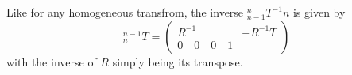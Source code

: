 Like for any homogeneous transfrom, the inverse $_{n-1}^nT^{-1}n$ is given by
\begin{equation}
^{n-1}_nT=\left(
\begin{array}{c|c}
R^{-1} & -R^{-1}T\\
\hline
0 \quad 0 \quad 0 \quad 1
\end{array}
\right)
\end{equation}
with the inverse of $R$ simply being its transpose.
